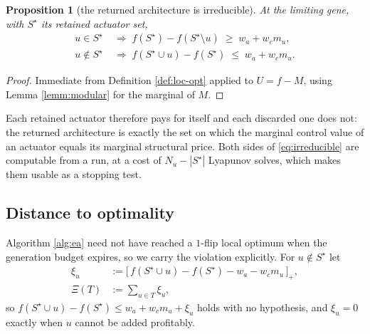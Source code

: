 \documentclass[letterpaper, 10pt, conference]{ieeeconf}
\newtheorem{proposition}{Proposition}
\begin{document}
\begin{proposition}[the returned architecture is irreducible]\label{prop:irreducible}
At the limiting gene, with $S^\star$ its retained actuator set,
\begin{equation}\label{eq:irreducible}
\begin{aligned}
  u\in S^\star &\;\Rightarrow\; f(S^\star)-f(S^\star\!\setminus u) \;\geq\; w_a + w_c m_u,\\
  u\notin S^\star &\;\Rightarrow\; f(S^\star\!\cup u)-f(S^\star) \;\leq\; w_a + w_c m_u.
\end{aligned}
\end{equation}
\end{proposition}
\begin{proof}
Immediate from Definition \ref{def:loc-opt} applied to $U = f - M$, using Lemma
\ref{lemm:modular} for the marginal of $M$.
\end{proof}

Each retained actuator therefore pays for itself and each discarded one does not:
the returned architecture is exactly the set on which the marginal control value
of an actuator equals its marginal structural price. Both sides of
\eqref{eq:irreducible} are computable from a run, at a cost of
$N_u - |S^\star|$ Lyapunov solves, which makes them usable as a stopping test.

\subsection{Distance to optimality}

Algorithm \ref{alg:ea} need not have reached a $1$-flip local optimum when the
generation budget expires, so we carry the violation explicitly. For
$u\notin S^\star$ let
\begin{equation}\label{eq:slack}
\begin{aligned}
  \xi_u &:= \bigl[\,f(S^\star\!\cup u)-f(S^\star) - w_a - w_c m_u\,\bigr]_+ ,\\
  \Xi(T) &:= \textstyle\sum_{u\in T}\xi_u ,
\end{aligned}
\end{equation}
so $f(S^\star\!\cup u)-f(S^\star) \leq w_a + w_c m_u + \xi_u$ holds with no
hypothesis, and $\xi_u = 0$ exactly when $u$ cannot be added profitably.
\end{document}
